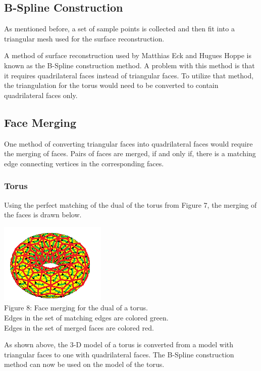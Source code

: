 \documentclass[12pt]{article}
\begin{document}
\begin{flushleft}
\section*{B-Spline Construction}
As mentioned before, a set of sample points is collected and then fit into a triangular mesh used for the surface reconstruction.

\medskip
A method of surface reconstruction used by Matthias Eck and Hugues Hoppe is known as the B-Spline construction method. A problem with this method is that it requires quadrilateral faces instead of triangular faces. To utilize that method, the triangulation for the torus would need to be converted to contain quadrilateral faces only.

\subsection*{Face Merging}
\medskip
One method of converting triangular faces into quadrilateral faces would require the merging of faces. Pairs of faces are merged, if and only if, there is a matching edge connecting vertices in the corresponding faces.

\subsubsection*{Torus}
Using the perfect matching of the dual of the torus from Figure 7, the merging of the faces is drawn below.

\begin{center}
\includegraphics[scale=1.7]{images/torusmerging.png}\\
Figure 8: Face merging for the dual of a torus.\\
Edges in the set of matching edges are colored green.\\
Edges in the set of merged faces are colored red.
\end{center}

As shown above, the 3-D model of a torus is converted from a model with triangular faces to one with quadrilateral faces. The B-Spline construction method can now be used on the model of the torus.


\end{flushleft}
\end{document}

